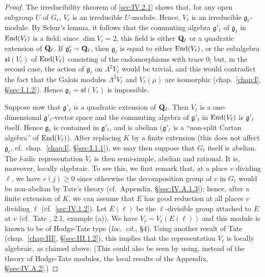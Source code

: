 \begin{proof}
The irreducibility theorem of \ref{sec:IV.2.1} shows that, for any open subgroup $U$
of $G_\ell$, $V_\ell$ is an irreducible $U$-module.  Hence, $V_\ell$ is
an irreducible $\mathfrak{g}_\ell$-module.  By Schur's lemma, it follows
that the commuting algebra $\mathfrak{g}'_\ell$ of $\mathfrak{g}_\ell$ in
$\mathrm{End}(V_\ell)$ is a field; since $\dim V_\ell = 2$, this field is either
$\mathbf{Q}_\ell$ or a quadratic extension of $\mathbf{Q}_\ell$.  If
$\mathfrak{g}'_\ell = \mathbf{Q}_\ell$, then $\mathfrak{g}_\ell$ is equal to
either $\mathrm{End}(V_\ell)$, or the subalgebra $\mathfrak{sl}(V_\ell)$ of
$\mathrm{End}(V_\ell)$ consisting of the endomorphisms with trace $0$; but, in
the second case, the action of $\mathfrak{g}_\ell$ on $\Lambda^2 V_\ell$
would be trivial, and this would contradict the fact that the Galois
modules $\Lambda^2 V_\ell$ and $V_\ell(\mu)$ are isomorphic
(chap.~\ref{chap:I}, \S\ref{sec:I.1.2}).  Hence
$\mathfrak{g}_\ell = \mathfrak{sl}(V_\ell)$ is impossible.

Suppose now that $\mathfrak{g}'_\ell$ is a quadratic extension of
$\mathbf{Q}_\ell$.  Then $V_\ell$ is a one-dimensional
$\mathfrak{g}'_\ell$-vector space and the commuting algebra of
$\mathfrak{g}'_\ell$ in $\mathrm{End}(V_\ell)$ is $\mathfrak{g}'_\ell$ itself.
Hence $\mathfrak{g}_\ell$ is contained in $\mathfrak{g}'_\ell$, and is
abelian ($\mathfrak{g}'_\ell$ is a ``non-split Cartan algebra'' of
$\mathrm{End}(V_\ell)$).  After replacing $K$ by a finite extension (this does
not affect $\mathfrak{g}_\ell$, cf.~chap.~\ref{chap:I},
\S\ref{sec:I.1.1}), we may then suppose that $G_\ell$ itself is abelian.
The \textit{l}-adic representation $V_\ell$ is then semi-simple, abelian
and rational.  It is, moreover, locally algebraic.  To see this, we first
remark that, at a place $v$ dividing $\ell$, we have $v(j) \geq 0$ since
otherwise the decomposition group of $v$ in $G_\ell$ would be non-abelian
by Tate's theory (cf.~Appendix, \S\ref{sec:IV.A.1.3}); hence, after a
finite extension of $K$, we can assume that $E$ has good reduction at all
places $v$ dividing $\ell$ (cf.~\ref{sec:IV.1.2}).  Let $E(\ell)$ be the
$\ell$-divisible group attached to $E$ at $v$ (cf.~Tate
\cite{tate-pdiv}, 2.1, example (a)).  We have
$V_\ell \sim V_\ell(E(\ell))$ and this module is known to be of
Hodge-Tate type (\emph{loc.~cit.}, \S4).  Using another result of Tate
(chap.~\ref{chap:III}, \S\ref{sec:III.1.2}), this implies that the
representation $V_\ell$ is locally algebraic, as claimed above.  (This
could also be seen by using, instead of the theory of Hodge-Tate modules,
the local results of the Appendix, \S\ref{sec:IV.A.2}.)


\end{proof}
